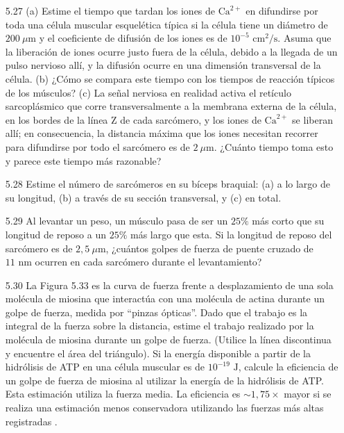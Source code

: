 \documentclass[12pt]{book}
\begin{document}
\begin{enumerate}
(d) ¿Los resultados en (b) y (c) plantean dudas sobre el cálculo en el Cap. 3 (y por qué)? Si es así, ¿invalida esto totalmente el cálculo o significa que después de alcanzar cierta velocidad de contracción muscular se debe incluir la disminución de la fuerza muscular para mejorar el modelo? (Además, note que dado que el bíceps braquial tiene muchas fibras musculares ST, el límite ``FT'' no es muy realista).

\subsection*{Procesos microscópicos y nanoscópicos en los músculos}

\item[5.27] (a) Estime el tiempo que tardan los iones de $\text{Ca}^{2+}$ en difundirse por toda una célula muscular esquelética típica si la célula tiene un diámetro de $200\ \mu\text{m}$ y el coeficiente de difusión de los iones es de $10^{-5}\text{ cm}^2/\text{s}$. Asuma que la liberación de iones ocurre justo fuera de la célula, debido a la llegada de un pulso nervioso allí, y la difusión ocurre en una dimensión transversal de la célula.
(b) ¿Cómo se compara este tiempo con los tiempos de reacción típicos de los músculos?
(c) La señal nerviosa en realidad activa el retículo sarcoplásmico que corre transversalmente a la membrana externa de la célula, en los bordes de la línea Z de cada sarcómero, y los iones de $\text{Ca}^{2+}$ se liberan allí; en consecuencia, la distancia máxima que los iones necesitan recorrer para difundirse por todo el sarcómero es de $2\ \mu\text{m}$. ¿Cuánto tiempo toma esto y parece este tiempo más razonable?

\item[5.28] Estime el número de sarcómeros en su bíceps braquial:
(a) a lo largo de su longitud,
(b) a través de su sección transversal, y
(c) en total.

\item[5.29] Al levantar un peso, un músculo pasa de ser un $25\%$ más corto que su longitud de reposo a un $25\%$ más largo que esta. Si la longitud de reposo del sarcómero es de $2{,}5\ \mu\text{m}$, ¿cuántos golpes de fuerza de puente cruzado de $11\text{ nm}$ ocurren en cada sarcómero durante el levantamiento?

\item[5.30] La Figura 5.33 es la curva de fuerza frente a desplazamiento de una sola molécula de miosina que interactúa con una molécula de actina durante un golpe de fuerza, medida por ``pinzas ópticas''. Dado que el trabajo es la integral de la fuerza sobre la distancia, estime el trabajo realizado por la molécula de miosina durante un golpe de fuerza. (Utilice la línea discontinua y encuentre el área del triángulo). Si la energía disponible a partir de la hidrólisis de ATP en una célula muscular es de $10^{-19}\text{ J}$, calcule la eficiencia de un golpe de fuerza de miosina al utilizar la energía de la hidrólisis de ATP. Esta estimación utiliza la fuerza media. La eficiencia es $\sim 1{,}75\times$ mayor si se realiza una estimación menos conservadora utilizando las fuerzas más altas registradas \cite{17}.


\end{enumerate}
\end{document}
